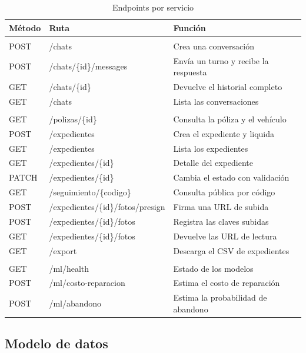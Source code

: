\documentclass[12pt,letterpaper]{article}
\begin{document}
\begin{table}[H]
\centering
\sloppy
\caption{Endpoints por servicio}
\label{tab:api}
\footnotesize
\begin{tabular}{>{\raggedright\arraybackslash}p{1.5cm}>{\raggedright\arraybackslash}p{6.3cm}>{\raggedright\arraybackslash}p{7.4cm}}
\toprule
\textbf{Método} & \textbf{Ruta} & \textbf{Función} \\
\midrule
\multicolumn{3}{@{}l}{\textit{Agente}} \\
POST & /chats & Crea una conversación \\
POST & /chats/\{id\}/messages & Envía un turno y recibe la respuesta \\
GET  & /chats/\{id\} & Devuelve el historial completo \\
GET  & /chats & Lista las conversaciones \\
\addlinespace
\multicolumn{3}{@{}l}{\textit{Core}} \\
GET  & /polizas/\{id\} & Consulta la póliza y el vehículo \\
POST & /expedientes & Crea el expediente y liquida \\
GET  & /expedientes & Lista los expedientes \\
GET  & /expedientes/\{id\} & Detalle del expediente \\
PATCH & /expedientes/\{id\} & Cambia el estado con validación \\
GET  & /seguimiento/\{codigo\} & Consulta pública por código \\
POST & /expedientes/\{id\}/fotos/presign & Firma una URL de subida \\
POST & /expedientes/\{id\}/fotos & Registra las claves subidas \\
GET  & /expedientes/\{id\}/fotos & Devuelve las URL de lectura \\
GET  & /export & Descarga el CSV de expedientes \\
\addlinespace
\multicolumn{3}{@{}l}{\textit{Modelos}} \\
GET  & /ml/health & Estado de los modelos \\
POST & /ml/costo-reparacion & Estima el costo de reparación \\
POST & /ml/abandono & Estima la probabilidad de abandono \\
\bottomrule
\end{tabular}
\end{table}

\subsection{Modelo de datos}
\end{document}
